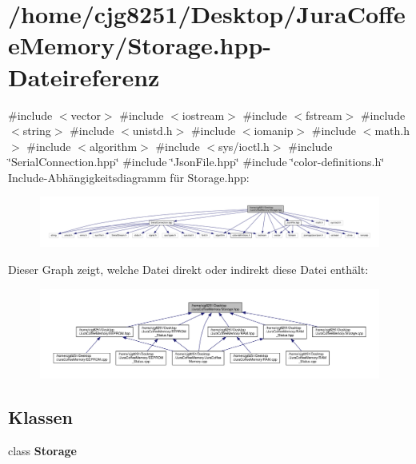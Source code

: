 \section{/home/cjg8251/\+Desktop/\+Jura\+Coffee\+Memory/\+Storage.hpp-\/\+Dateireferenz}
\label{_storage_8hpp}
{\ttfamily \#include $<$vector$>$}\newline
{\ttfamily \#include $<$iostream$>$}\newline
{\ttfamily \#include $<$fstream$>$}\newline
{\ttfamily \#include $<$string$>$}\newline
{\ttfamily \#include $<$unistd.\+h$>$}\newline
{\ttfamily \#include $<$iomanip$>$}\newline
{\ttfamily \#include $<$math.\+h$>$}\newline
{\ttfamily \#include $<$algorithm$>$}\newline
{\ttfamily \#include $<$sys/ioctl.\+h$>$}\newline
{\ttfamily \#include \char`\"{}Serial\+Connection.\+hpp\char`\"{}}\newline
{\ttfamily \#include \char`\"{}Json\+File.\+hpp\char`\"{}}\newline
{\ttfamily \#include \char`\"{}color-\/definitions.\+h\char`\"{}}\newline
Include-\/\+Abhängigkeitsdiagramm für Storage.\+hpp\+:
\nopagebreak
\begin{figure}[H]
\begin{center}
\leavevmode
\includegraphics[width=350pt]{_storage_8hpp__incl}
\end{center}
\end{figure}
Dieser Graph zeigt, welche Datei direkt oder indirekt diese Datei enthält\+:
\nopagebreak
\begin{figure}[H]
\begin{center}
\leavevmode
\includegraphics[width=350pt]{_storage_8hpp__dep__incl}
\end{center}
\end{figure}
\subsection*{Klassen}
\begin{DoxyCompactItemize}
\item 
class \textbf{ Storage}
\end{DoxyCompactItemize}
